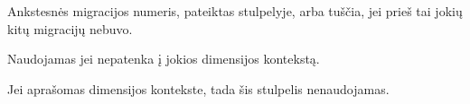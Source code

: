\documentclass[letterpaper,10pt,lithuanian]{sphinxmanual}
\begin{document}

\begin{fulllineitems}
\label{\detokenize{dimensijos:migrate.ref}}
\pysigstartsignatures
{}
\pysigstopsignatures
\sphinxAtStartPar
Ankstesnės migracijos numeris, pateiktas {\hyperref[\detokenize{dimensijos:migrate.id}]{}} stulpelyje,
arba tuščia, jei prieš tai jokių kitų migracijų nebuvo.

\sphinxAtStartPar
Naudojamas jei {\hyperref[\detokenize{dimensijos:module-migrate}]{}} nepatenka į jokios dimensijos kontekstą.

\sphinxAtStartPar
Jei {\hyperref[\detokenize{dimensijos:module-migrate}]{}} aprašomas dimensijos kontekste, tada šis stulpelis
nenaudojamas.

\end{fulllineitems}

\end{document}
